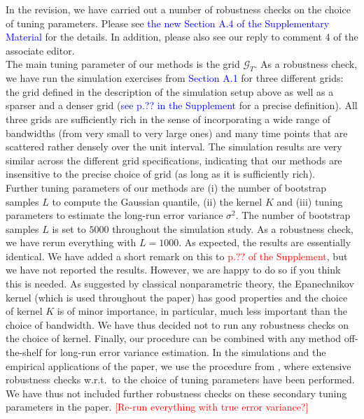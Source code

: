\documentclass[a4paper,12pt]{article}
\begin{document}
\begin{enumerate}[label=\arabic*.,leftmargin=0.6cm]
In the revision, we have carried out a number of robustness checks on the choice of tuning parameters. Please see \textcolor{blue}{the new Section A.4 of the Supplementary Material} for the details. In addition, please also see our reply to comment 4 of the associate editor. \\
The main tuning parameter of our methods is the grid $\mathcal{G}_T$. As a robustness check, we have run the simulation exercises from  \textcolor{blue}{Section A.1} for three different grids: the grid defined in the description of the simulation setup above as well as a sparser and a denser grid (\textcolor{blue}{see p.?? in the Supplement} for a precise definition). All three grids are sufficiently rich in the sense of incorporating a wide range of bandwidths (from very small to very large ones) and many time points that are scattered rather densely over the unit interval. The simulation results are very similar across the different grid specifications, indicating that our methods are insensitive to the precise choice of grid (as long as it is sufficiently rich). \\
Further tuning parameters of our methods are (i) the number of bootstrap samples $L$ to compute the Gaussian quantile, (ii) the kernel $K$ and (iii) tuning parameters to estimate the long-run error variance $\sigma^2$. 
The number of bootstrap samples $L$ is set to $5000$ throughout the simulation study. As a robustness check, we have rerun everything with $L=1000$. As expected, the results are essentially identical. We have added a short remark on this to \textcolor{red}{p.?? of the Supplement}, but we have not reported the results. However, we are happy to do so if you think this is needed.
As suggested by classical nonparametric theory, the Epanechnikov kernel (which is used throughout the paper) has good properties and the choice of kernel $K$ is of minor importance, in particular, much less important than the choice of bandwidth. We have thus decided not to run any robustness checks on the choice of kernel. 
Finally, our procedure can be combined with any method off-the-shelf for long-run error variance estimation. In the simulations and the empirical applications of the paper, we use the procedure from \cite{KhismatullinaVogt2020}, where extensive robustness checks w.r.t.\ to the choice of tuning parameters have been performed. We have thus not included further robustness checks on these secondary tuning parameters in the paper.   
\textcolor{red}{[Re-run everything with true error variance?]}


\end{enumerate}
\end{document}
